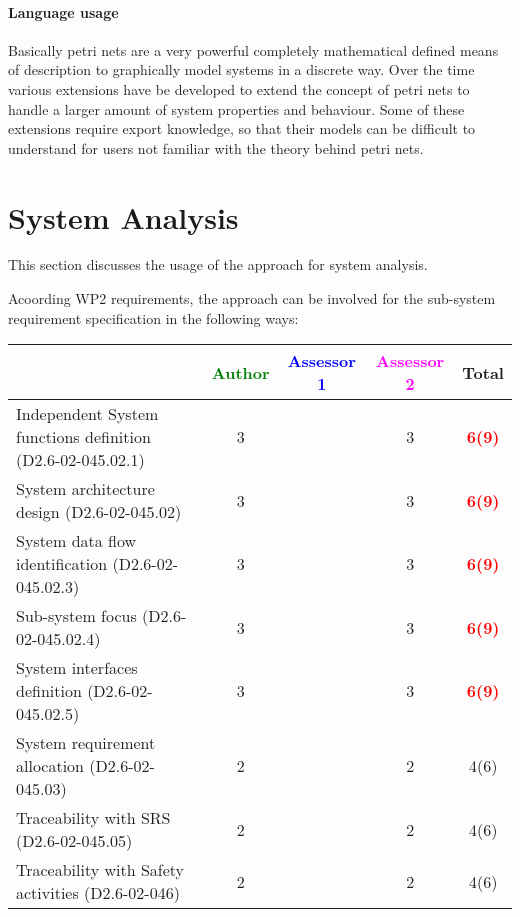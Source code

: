 \paragraph{Language usage} Basically petri nets are a very powerful completely mathematical defined means of description to graphically model systems in a discrete way. Over the time various extensions have be developed to extend the concept of petri nets to handle a larger amount of system properties and  behaviour. Some of these extensions require export knowledge, so that their models can be difficult to understand for users not familiar with the theory behind petri nets.

\section{System Analysis}
This section discusses the usage of the approach for system analysis.

Acoording WP2 requirements, the approach can be involved for the sub-system requirement specification in the following ways:

\begin{tabular}{|l | c | c | c | c|}
\hline
& \textcolor{green}{Author} & \textcolor{blue}{Assessor 1} & \textcolor{magenta}{Assessor 2} & Total \\
\hline
Independent System functions definition (D2.6-02-045.02.1)  & 3     & & 3     &\textcolor{red}{\textbf{6(9)}}  \\
\hline 
System architecture design (D2.6-02-045.02) & 3     & & 3     &\textcolor{red}{\textbf{6(9)}}  \\
\hline
System data flow identification (D2.6-02-045.02.3)  & 3     & & 3     &\textcolor{red}{\textbf{6(9)}}  \\
\hline
Sub-system focus (D2.6-02-045.02.4)  & 3     & & 3     &\textcolor{red}{\textbf{6(9)}}  \\
\hline
System interfaces definition (D2.6-02-045.02.5)  & 3     & & 3     &  \textcolor{red}{\textbf{6(9)}}  \\
\hline
System requirement allocation (D2.6-02-045.03)  & 2     & & 2     &  4(6) \\
\hline
Traceability with SRS (D2.6-02-045.05)  & 2     & & 2     &  4(6) \\
\hline
Traceability with Safety activities (D2.6-02-046)  & 2     & & 2     &  4(6) \\
\hline
\end{tabular}



